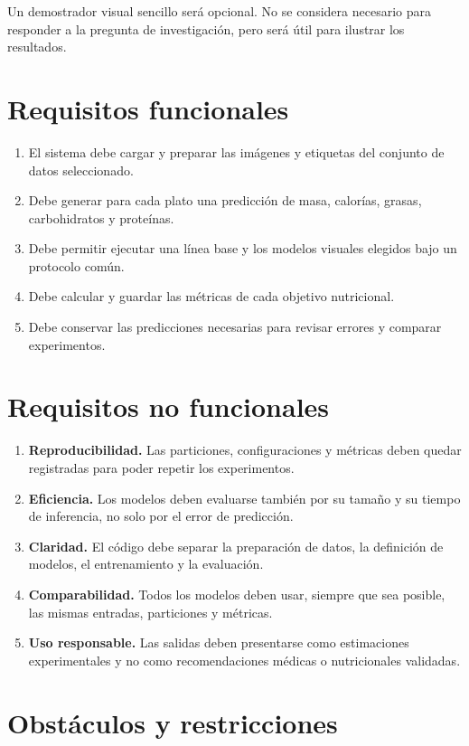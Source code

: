 Un demostrador visual sencillo será opcional. No se considera necesario para
responder a la pregunta de investigación, pero será útil para ilustrar los resultados.

\section{Requisitos funcionales}

\begin{enumerate}
  \item El sistema debe cargar y preparar las imágenes y etiquetas del conjunto
  de datos seleccionado.
  \item Debe generar para cada plato una predicción de masa, calorías, grasas,
  carbohidratos y proteínas.
  \item Debe permitir ejecutar una línea base y los modelos visuales elegidos
  bajo un protocolo común.
  \item Debe calcular y guardar las métricas de cada objetivo nutricional.
  \item Debe conservar las predicciones necesarias para revisar errores y
  comparar experimentos.
\end{enumerate}

\section{Requisitos no funcionales}

\begin{enumerate}
  \item \textbf{Reproducibilidad.} Las particiones, configuraciones y métricas deben
  quedar registradas para poder repetir los experimentos.
  \item \textbf{Eficiencia.} Los modelos deben evaluarse también por su tamaño y su
  tiempo de inferencia, no solo por el error de predicción.
  \item \textbf{Claridad.} El código debe separar la preparación de datos, la definición
  de modelos, el entrenamiento y la evaluación.
  \item \textbf{Comparabilidad.} Todos los modelos deben usar, siempre que sea posible,
  las mismas entradas, particiones y métricas.
  \item \textbf{Uso responsable.} Las salidas deben presentarse como estimaciones
  experimentales y no como recomendaciones médicas o nutricionales validadas.
\end{enumerate}


\section{Obstáculos y restricciones}

